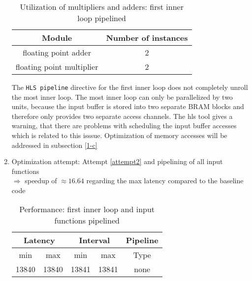 \documentclass{article}
\begin{document}
\begin{enumerate}
	\begin{table}[H]
		\centering
		\begin{tabular}{cc}
			Module & Number of instances \\
			\hline
			floating point adder & 2 \\
			floating point multiplier & 2
		\end{tabular}
		\caption{Utilization of multipliers and adders: first inner loop pipelined}
		\label{1-b-resources-arithmetic-2}
	\end{table}

	The \texttt{HLS pipeline} directive for the first inner loop does not completely unroll the most inner loop. The most inner loop can only be parallelized by two units, because the input buffer is stored into two separate BRAM blocks and therefore only provides two separate access channels. The hls tool gives a warning, that there are problems with scheduling the input buffer accesses which is related to this isssue. Optimization of memory accesses will be addressed in subsection \ref{1-c}

	\item Optimization attempt: Attempt \ref{attempt2} and pipelining of all input functions \\
		\label{attempt3}
		$\Rightarrow$ speedup of $\approx 16.64 $ regarding the max latency compared to the baseline code
	\begin{table}[H]
		\centering
		\begin{tabular}{ccccc}
			\multicolumn{2}{c}{Latency} & \multicolumn{2}{c}{Interval} & Pipeline\\
			\hline
			min  &   max  &   min  &   max  &   Type  \\
			13840&  13840&  13841&  13841&   none
		\end{tabular}
		\caption{Performance: first inner loop and input functions pipelined}
		\label{1-b-perf-table-3}
	\end{table}


\end{enumerate}
\end{document}
